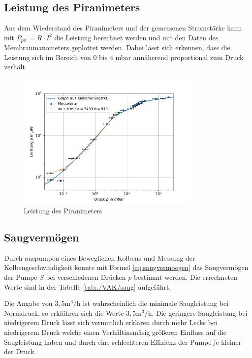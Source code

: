 \documentclass[11pt, a4paper]{article}
\begin{document}
    \subsection{Leistung des Piranimeters}
    Aus dem Wiederstand des Piranimeters und der gemessenen Stromstärke kann mit $P_{pir} = R \cdot I^2$ die Leistung berechnet werden und mit den Daten des Membranmanometers geplottet werden. Dabei lässt sich erkennen, dass die Leistung sich im Bereich von 0 bis 4 \si{\milli\bar} annäherend proportional zum Druck verhält. 
    \begin{figure}[h]
        \centering
        \includegraphics[width=0.8\textwidth]{Pp_Graph.pdf}
        \caption{Leistung des Piranimeters}
        \label{fig:Pzup}
    \end{figure}



    \subsection{Saugvermögen}
    Durch auspumpen eines Beweglichen Kolbens und Messung der Kolbengeschwindigkeit konnte mit Formel \ref{eq:saugvermoegen}  das Saugvermögen der Pumpe $S$ bei verschiedenen Drücken $p$ bestimmt werden. Die errechneten Werte sind in der Tabelle \ref{tab:./VAK/saug} aufgeführt.
    
    Die Angabe von $3,5 \si{\meter\cubed\per\hour}$ ist wahrscheinlich die minimale Saugleistung bei Normdruck, so erklähren sich die Werte \> $3,5 \si{\meter\cubed\per\hour}$. 
    Die geringere Saugleistung bei niedrigerem Druck lässt sich vermutlich erklären durch mehr Lecks bei niedrigerem Druck welche einen Verhältinsmäsig größeren Einfluss auf die Saugleistung haben und durch eine schlechteren Effizienz der Pumpe je kleiner der Druck.
\end{document}
